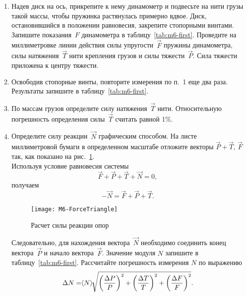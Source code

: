 \documentclass[a4paper, 12pt]{extarticle}
\begin{document}
\begin{enumerate}
\item Надев диск на ось, прикрепите к нему динамометр и подвесьте на нити грузы такой массы, чтобы пружинка растянулась примерно вдвое. Диск, остановившийся в положении равновесия, закрепите стопорными винтами. Запишите показания~$F$ динамометра в таблицу~\ref{tab:m6-first}. Проведите на миллиметровке линии действия силы упругости~$\vec{F}$ пружины динамометра, силы натяжения~$\vec{T}$ нити крепления грузов и силы тяжести~$\vec{P}$. Сила тяжести приложена к центру тяжести. 
\item Освободив стопорные винты, повторите измерения по п.~1 еще два раза. Результаты запишите в таблицу~\ref{tab:m6-first}.
\item По массам грузов определите силу натяжения~$\vec{T}$ нити. Относительную погрешность определения силы~$\vec{T}$ считать равной 1\%. 
\item Определите силу реакции~$\vec{N}$ графическим способом. На листе миллиметровой бумаги в определенном масштабе отложите векторы $\vec{P} + \vec{T}$, $\vec{F}$ так, как показано на рис.~\ref{fig:m6-scheme}. \\
Используя условие равновесия системы
\begin{equation}
\label{eq:m6-balance}
\vec{F} + \vec{P} + \vec{T} + \vec{N} = 0,
\end{equation}
получаем
\begin{equation}
\label{eq:m6-reaction-force}
-\vec{N} = \vec{F} + \vec{P} + \vec{T}.
\end{equation}

\begin{figure}[h]
\begin{center}
\texttt{[image: M6-ForceTriangle]}
\end{center}
\caption{Расчет силы реакции опор \label{fig:m6-scheme}}
\end{figure}

Следовательно, для нахождения вектора~$\vec{N}$ необходимо соединить конец вектора~$\vec{P}$ и начало вектора~$\vec{F}$. Значение модуля $N$ запишите в таблицу~\ref{tab:m6-first}. Рассчитайте погрешность измерения $N$ по выражению
\begin{equation}
\label{eq:m6-reaction-force-error}
\Delta N = \hspace{-3pt}\left<N\right>\hspace{-3pt} \sqrt{\left( \frac{\Delta P}{P} \right) ^2 + \left( \frac{\Delta T}{T} \right) ^2 + \left( \frac{\Delta F}{F} \right) ^2}.
\end{equation}
\end{enumerate}
\end{document}
